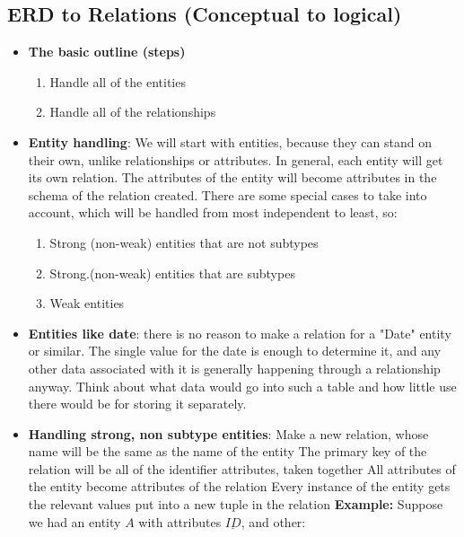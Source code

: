 \documentclass{report}
\begin{document}
    \pagebreak 
    \subsection{ERD to Relations (Conceptual to logical)}
    \begin{itemize}
        \item \textbf{The basic outline (steps)}
            \begin{enumerate}
                \item Handle all of the entities
                \item Handle all of the relationships
            \end{enumerate}
        \item \textbf{Entity handling}: We will start with entities, because they can stand on their own, unlike relationships or attributes. In general, each entity will get its own relation. The attributes of the entity will become attributes in the schema of the relation created. There are some special cases to take into account, which will be handled from most independent to least, so:
            \begin{enumerate}[label=\alph*.]
                \item Strong (non-weak) entities that are not subtypes
                \item Strong.(non-weak) entities that are subtypes
                \item Weak entities
            \end{enumerate}
        \item \textbf{Entities like date}: there is no reason to make a relation for a "Date" entity or similar. The single value for the date is enough to determine it, and any other data associated with it is generally happening through a relationship anyway. Think about what data would go into such a table and how little use there would be for storing it separately.
        \item \textbf{Handling strong, non subtype entities}: Make a new relation, whose name will be the same as the name of the entity  
            \bigbreak \noindent 
            The primary key of the relation will be all of the identifier attributes, taken together  All attributes of the entity become attributes of the relation  Every instance of the entity gets the relevant values put into a new tuple in the relation
            \bigbreak \noindent 
            \textbf{Example:} Suppose we had an entity $A$ with attributes $\underline{ID}$, and other:

\end{itemize}
\end{document}
